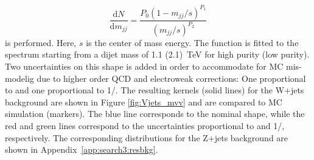 \begin{equation}
\frac{\text{d} N}{\text{d} m_{jj}} = \frac{P_0 (1-m_{jj}/s)^{P_1}}{(m_{jj}/s)^{P_2}}
\end{equation}
is performed. Here, $s$ is the center of mass energy. The function is fitted to the spectrum starting from a dijet mass of 1.1 (2.1)~TeV for high purity (low purity). Two uncertainties on this shape is added in order to accommodate for MC mis-modelig due to higher order QCD and electroweak corrections: One proportional to \MVV and one proportional to 1/\MVV. The resulting \MVV kernels (solid lines) for the W+jets background are shown in Figure \ref{fig:Vjets_mvv} and are compared to MC simulation (markers). The blue line corresponds to the nominal shape, while the red and green lines correspond to the uncertainties proportional to \MVV and 1/\MVV, respectively. The corresponding distributions for the Z+jets background are shown in Appendix~\ref{app:search3:resbkg}.\par
